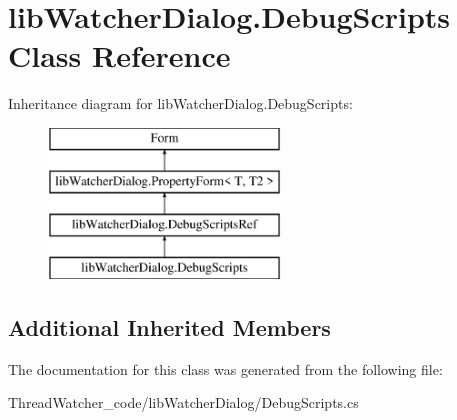 \hypertarget{classlib_watcher_dialog_1_1_debug_scripts}{\section{lib\+Watcher\+Dialog.\+Debug\+Scripts Class Reference}
\label{classlib_watcher_dialog_1_1_debug_scripts}
}
Inheritance diagram for lib\+Watcher\+Dialog.\+Debug\+Scripts\+:\begin{figure}[H]
\begin{center}
\leavevmode
\includegraphics[height=4.000000cm]{classlib_watcher_dialog_1_1_debug_scripts}
\end{center}
\end{figure}
\subsection*{Additional Inherited Members}


The documentation for this class was generated from the following file\+:\begin{DoxyCompactItemize}
\item 
Thread\+Watcher\+\_\+code/lib\+Watcher\+Dialog/Debug\+Scripts.\+cs\end{DoxyCompactItemize}
